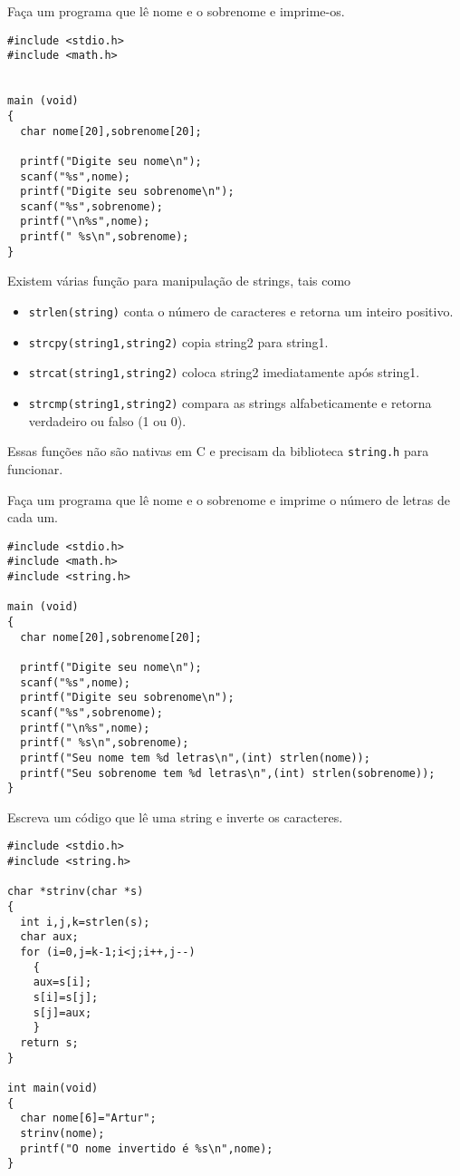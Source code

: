 \begin{ex}Faça um programa que lê nome e o sobrenome e imprime-os.
\end{ex}
\begin{verbatim}
#include <stdio.h>
#include <math.h>


main (void)
{
  char nome[20],sobrenome[20];

  printf("Digite seu nome\n");
  scanf("%s",nome);
  printf("Digite seu sobrenome\n");
  scanf("%s",sobrenome);
  printf("\n%s",nome);
  printf(" %s\n",sobrenome);
}
\end{verbatim}
Existem várias função para manipulação de strings, tais como
\begin{itemize}
\item \verb|strlen(string)| conta o número de caracteres e retorna um inteiro positivo.
\item \verb|strcpy(string1,string2)| copia string2 para string1.
\item \verb|strcat(string1,string2)| coloca string2 imediatamente após string1.
\item \verb|strcmp(string1,string2)| compara as strings alfabeticamente e retorna verdadeiro ou falso (1 ou 0).
\end{itemize}
Essas funções não são nativas em C e precisam da biblioteca \verb|string.h| para funcionar.
\begin{ex}Faça um programa que lê nome e o sobrenome e imprime o número de letras de cada um.
\end{ex}
\begin{verbatim}
#include <stdio.h>
#include <math.h>
#include <string.h>

main (void)
{
  char nome[20],sobrenome[20];

  printf("Digite seu nome\n");
  scanf("%s",nome);
  printf("Digite seu sobrenome\n");
  scanf("%s",sobrenome);
  printf("\n%s",nome);
  printf(" %s\n",sobrenome);
  printf("Seu nome tem %d letras\n",(int) strlen(nome));
  printf("Seu sobrenome tem %d letras\n",(int) strlen(sobrenome));
}
\end{verbatim}
\begin{ex}Escreva um código que lê uma string e inverte os caracteres.
\end{ex}
\begin{verbatim}
#include <stdio.h>
#include <string.h>

char *strinv(char *s)
{
  int i,j,k=strlen(s);
  char aux;
  for (i=0,j=k-1;i<j;i++,j--)
    {
    aux=s[i];
    s[i]=s[j];
    s[j]=aux;
    }
  return s;
}

int main(void)
{
  char nome[6]="Artur";
  strinv(nome);
  printf("O nome invertido é %s\n",nome);
}
\end{verbatim}

